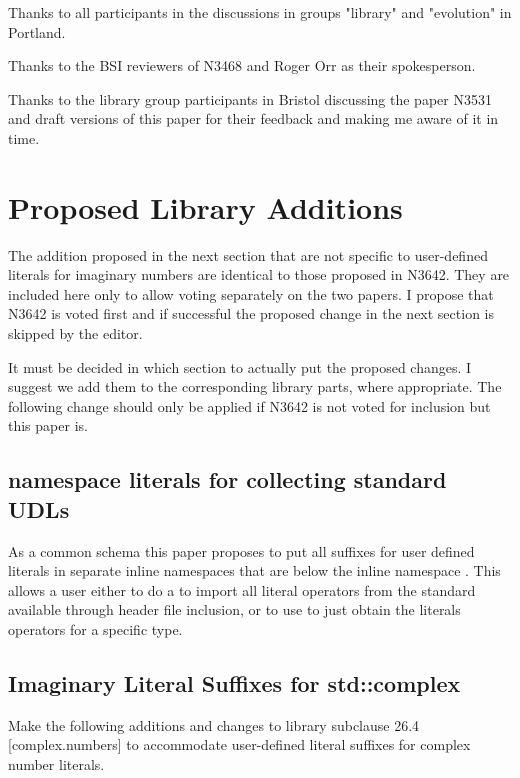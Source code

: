 \documentclass[ebook,11pt,article]{memoir}
\begin{document}
Thanks to all participants in the discussions in groups "library" and "evolution" in Portland.

Thanks to the BSI reviewers of N3468 and Roger Orr as their spokesperson.

Thanks to the library group participants in Bristol discussing the paper N3531 and draft versions of this paper for their feedback and making me aware of it in time.

\chapter{Proposed Library Additions}
The addition proposed in the next section that are not specific to user-defined literals for imaginary numbers are identical to those proposed in N3642. They are included here only to allow voting separately on the two papers. I propose that N3642 is voted first and if successful the proposed change in the next section is skipped by the editor.

It must be decided in which section to actually put the proposed changes. I suggest we add them to the corresponding library parts, where appropriate. The following change should only be applied if N3642 is not voted for inclusion but this paper is.



\section{namespace literals for collecting standard UDLs}
As a common schema this paper proposes to put all suffixes for user defined literals in separate inline namespaces that are below the inline namespace . 
\enternote
This allows a user either to do a  to import all literal operators from the standard available through header file inclusion, or to use  to just obtain the literals operators for a specific type.
\exitnote



\section{Imaginary Literal Suffixes for std::complex}
Make the following additions and changes to library subclause 26.4 [complex.numbers] to accommodate user-defined literal suffixes for complex number literals.
\end{document}
